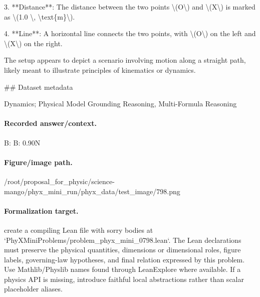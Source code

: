 3. **Distance**: The distance between the two points \textbackslash{}(O\textbackslash{}) and \textbackslash{}(X\textbackslash{}) is marked as \textbackslash{}(1.0 \textbackslash{}, \textbackslash{}text\{m\}\textbackslash{}).

4. **Line**: A horizontal line connects the two points, with \textbackslash{}(O\textbackslash{}) on the left and \textbackslash{}(X\textbackslash{}) on the right.

The setup appears to depict a scenario involving motion along a straight path, likely meant to illustrate principles of kinematics or dynamics.

\#\# Dataset metadata

Dynamics; Physical Model Grounding Reasoning, Multi-Formula Reasoning

\paragraph{Recorded answer/context.}
B: B: 0.90N

\paragraph{Figure/image path.}
/root/proposal\_for\_physic/science-mango/phyx\_mini\_run/phyx\_data/test\_image/798.png

\paragraph{Formalization target.}
create a compiling Lean file with sorry bodies at `PhyXMiniProblems/problem\_phyx\_mini\_0798.lean`. The Lean declarations must preserve the physical quantities, dimensions or dimensional roles, figure labels, governing-law hypotheses, and final relation expressed by this problem.
Use Mathlib/Physlib names found through LeanExplore where available. If a physics API is missing, introduce faithful local abstractions rather than scalar placeholder aliases.

